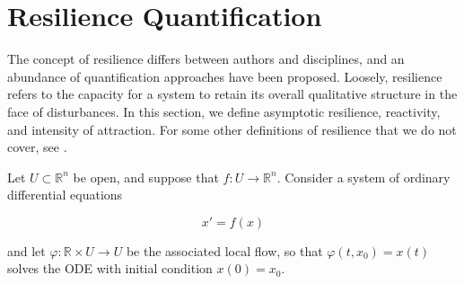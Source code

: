 \section{Resilience Quantification}
\label{sec:resilience}

The concept of resilience differs between authors and disciplines, and an abundance of quantification approaches have been proposed. Loosely, resilience refers to the capacity for a system to retain its overall qualitative structure in the face of disturbances. 
%
In this section, we define asymptotic resilience, reactivity, and intensity of attraction. 
%
For some other definitions of resilience that we do not cover, see \cite{meyerMathematicalReviewResilience2016}.



Let $U \subset \mathbb{R}^n$ be open, and suppose that $f : U \to \mathbb{R}^n$. Consider a system of ordinary differential equations 

\begin{equation}
	\label{eqn:ode}
	x' = f(x)
\end{equation}

and let $\varphi: \mathbb{R} \times U \to U$ be the associated local flow, so that $\varphi(t,x_0) = x(t)$ solves the ODE with initial condition $x(0) = x_0$.









